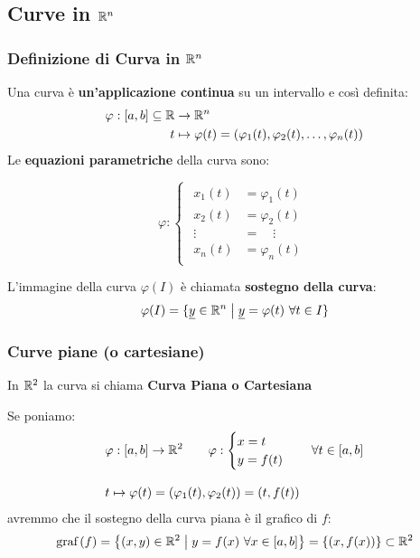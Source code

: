 \subsection{Curve in \texorpdfstring{\(\mathbb{R}^{n} \)}{Rn}}

\subsubsection{Definizione di Curva in \texorpdfstring{\(\mathbb{R}^{n} \)}{Rn}}

Una curva è \textbf{un'applicazione continua} su un intervallo e così definita:
\begin{align*}
    \varphi: [a,b] \subseteq \mathbb{R} & \rightarrow \mathbb{R}^{n}                                                        \\
    t                           & \mapsto \varphi(t) = (\varphi_1(t),\varphi_2(t), \ldots ,\varphi_n(t))
\end{align*}
Le \textbf{equazioni parametriche} della curva sono:

\begin{equation*}
    \varphi:
    \begin{cases}
        \begin{aligned}
            x_1(t)      & = \varphi_1(t) \\
            x_2(t)      & = \varphi_2(t) \\
            \vdots\quad & = \quad\vdots  \\
            x_n(t)      & = \varphi_n(t)
        \end{aligned}
    \end{cases}
\end{equation*}

L'immagine della curva \(\varphi(I)\) è chiamata \textbf{sostegno della curva}:
\[
    \varphi(I) = \{\underline{y} \in \mathbb{R}^{n} \;\big|\; \underline{y} = \varphi(t) ~\forall t \in I\}
\]

\subsubsection{Curve piane (o cartesiane)}

In \(\mathbb{R}^2\) la curva si chiama \textbf{Curva Piana o Cartesiana}

Se poniamo:
\begin{align*}
     & \varphi: [a,b]\rightarrow \mathbb{R}^{2} \qquad \varphi: \begin{cases}
                                                            x = t \\
                                                            y = f(t)
                                                        \end{cases} \quad \forall t \in [a,b] \\[3mm]
     & t \mapsto \varphi(t) = (\varphi_1(t), \varphi_2(t)) = (t,f(t))
\end{align*}
avremmo che il sostegno della curva piana è il grafico di \(f\):
\[
    \text{graf}\left(f\right) = \left\{(x,y) \in \mathbb{R}^2 \;\big|\; y=f(x) ~\forall x \in [a,b]\right\} = \left\{(x,f(x))\right\} \subset \mathbb{R}^2
\]

